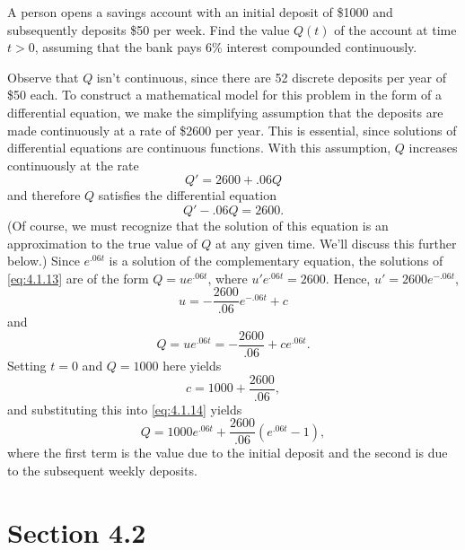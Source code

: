 \setcounter{example}{5}
\begin{example}
  \label{example:4.1.6} \rm A person opens a savings account with an initial deposit of \$1000 and
  subsequently deposits \$50 per week. Find the value $Q(t)$ of the account at time $t>0$, assuming
  that the bank pays 6\% interest compounded continuously.
\end{example}
\setcounter{equation}{12}
\begin{examplesolution}
\solution Observe that $Q$ isn't continuous, since there are 52 discrete deposits per year of \$50
each. To construct a mathematical model for this problem in the form of a differential equation, we
make the simplifying assumption that the deposits are made continuously at a rate of \$2600 per
year. This is essential, since solutions of differential equations are continuous functions. With
this assumption, $Q$ increases continuously at the rate
\[
  Q'=2600+.06Q
\]
and therefore $Q$ satisfies the differential equation
\begin{equation}
  \label{eq:4.1.13}Q'-.06Q=2600.
\end{equation}
(Of course, we must recognize that the solution of this equation is an approximation to the true
value of $Q$ at any given time. We'll discuss this further below.) Since $e^{.06t}$ is a solution of
the complementary equation, the solutions of \eqref{eq:4.1.13} are of the form $Q=ue^{.06t}$, where
$u'e^{.06t}=2600$. Hence, $u'=2600e^{-.06t}$,
\[
  u=-\frac{2600}{.06}e^{-.06t}+c
\]
and
\begin{equation}
  \label{eq:4.1.14}Q=ue^{.06t}=-\frac{2600}{.06}+ce^{.06t}.
\end{equation}
Setting $t=0$ and $Q=1000$ here yields
\[
  c=1000+\frac{2600}{.06},
\]
and substituting this into \eqref{eq:4.1.14} yields
\begin{equation}
  \label{eq:4.1.15}Q=1000e^{.06t}+\frac{2600}{.06}(e^{.06t}-1),%
\end{equation}
where the first term is the value due to the initial deposit and the second is due to the subsequent
weekly deposits. \bbox
\end{examplesolution}

\section*{Section 4.2}
\setcounter{chapter}{4}
\setcounter{section}{2}

